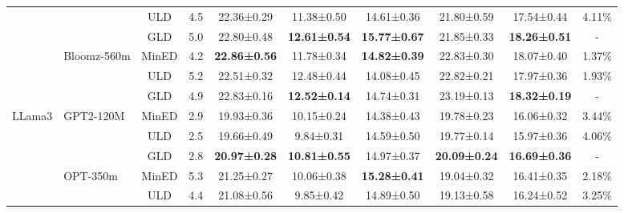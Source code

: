 \documentclass{article}
\begin{document}
\begin{table}[t]
{\begin{tabular}{l|l|ccccccc|c}
                                             &                                 & ULD                  & 4.5     & 22.36±0.29          & 11.38±0.50          & 14.61±0.36          & 21.80±0.59          & 17.54±0.44          & 4.11\%  \\
                                             &                                 & GLD                  & 5.0     & 22.80±0.48          & \textbf{12.61±0.54} & \textbf{15.77±0.67} & 21.85±0.33          & \textbf{18.26±0.51} & -       \\
                                             & \multirow{3}{*}{Bloomz-560m}    & MinED                & 4.2     & \textbf{22.86±0.56} & 11.78±0.34          & \textbf{14.82±0.39} & 22.83±0.30          & 18.07±0.40          & 1.37\%  \\
                                             &                                 & ULD                  & 5.2     & 22.51±0.32          & 12.48±0.44          & 14.08±0.45          & 22.82±0.21          & 17.97±0.36          & 1.93\%  \\
                                             &                                 & GLD                  & 4.9     & 22.83±0.16          & \textbf{12.52±0.14} & 14.74±0.31          & 23.19±0.13          & \textbf{18.32±0.19} & -       \\
\midrule
\multirow{9}{*}{LLama3}                      & \multirow{3}{*}{GPT2-120M}      & MinED                & 2.9     & 19.93±0.36          & 10.15±0.24          & 14.38±0.43          & 19.78±0.23          & 16.06±0.32          & 3.44\%  \\
                                             &                                 & ULD                  & 2.5     & 19.66±0.49          & 9.84±0.31           & 14.59±0.50          & 19.77±0.14          & 15.97±0.36          & 4.06\%  \\
                                             &                                 & GLD                  & 2.8     & \textbf{20.97±0.28} & \textbf{10.81±0.55} & 14.97±0.37          & \textbf{20.09±0.24} & \textbf{16.69±0.36} & -       \\
                                             & \multirow{3}{*}{OPT-350m}       & MinED                & 5.3     & 21.25±0.27          & 10.06±0.38          & \textbf{15.28±0.41} & 19.04±0.32          & 16.41±0.35          & 2.18\%  \\
                                             &                                 & ULD                  & 4.4     & 21.08±0.56          & 9.85±0.42           & 14.89±0.50          & 19.13±0.58          & 16.24±0.52          & 3.25\%  \\

\end{tabular}}
\end{table}
\end{document}
